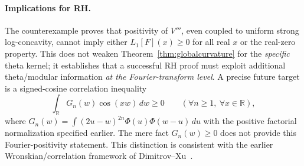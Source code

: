 \paragraph{Implications for RH.}
The counterexample proves that positivity of
$V'''$, even coupled to uniform strong log-concavity,
cannot imply either $L_1[F](x)\ge0$ for all real $x$
or the real-zero property. This does not weaken
Theorem~\ref{thm:globalcurvature} for the \emph{specific}
theta kernel; it establishes that a successful RH proof
must exploit additional theta/modular information
\emph{at the Fourier-transform level}.
A precise future target is a signed-cosine
correlation inequality
\[
\int_{\mathbb R}
G_n(w)\cos(xw)\,dw\ge0\qquad
(\forall n\ge1,\ \forall x\in\mathbb R),
\]
where
$G_n(w)=\int(2u-w)^{2n}\Phi(u)\Phi(w-u)\,du$
with the positive factorial normalization
specified earlier. The mere fact $G_n(w)\ge0$
does not provide this Fourier-positivity statement.
This distinction is consistent with the earlier
Wronskian/correlation framework of
Dimitrov--Xu~\cite{DX}.
